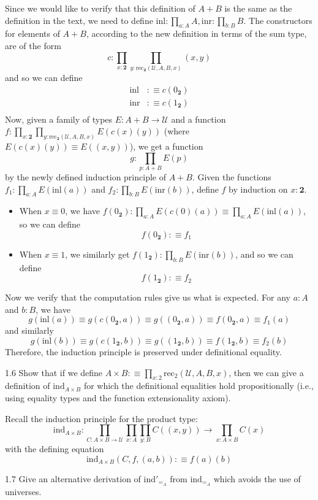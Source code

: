\documentclass[14pt]{extarticle}
\newcommand{\0}{{\mathbf 0}}
\newcommand{\1}{{\mathbf 1}}
\newcommand{\2}{{\mathbf 2}}
\newcommand{\UU}{{\mathcal U}}
\newcommand{\rec}{\mathrm{rec}}
\newcommand{\ind}{\mathrm{ind}}
\newcommand{\inl}{\mathrm{inl}}
\newcommand{\inr}{\mathrm{inr}}
\begin{document}
Since we would like to verify that this definition of $A+B$ is the same as the definition in the text, we need to define $\inl : \prod_{a:A} A, \inr : \prod_{b:B} B$. The constructors for elements of $A+B$, according to the new definition in terms of the sum type, are of the form \[c : \prod_{x : \2}\prod_{y : \rec_\2(\UU,A,B,x)}(x,y)\] and so we can define
\begin{align*}
\inl &:\equiv c(0_\2) \\
\inr &:\equiv c(1_\2) \\
\end{align*}
Now, given a family of types $E : A+B \to \UU$ and a function $f : \prod_{x:\2}\prod_{y:\rec_\2(\UU,A,B,x)}E(c(x)(y))$ (where $E(c(x)(y)) \equiv E((x,y))$), we get a function \[g : \prod_{p : A+B}E(p)\] by the newly defined induction principle of $A+B$. Given the functions $f_1 : \prod_{a:A}E(\inl(a))$ and $f_2 : \prod_{b:B}E(\inr(b))$, define $f$ by induction on $x:\2$.
\begin{itemize}
\item When $x \equiv 0$, we have $f(0_\2) : \prod_{a:A}E(c(0)(a)) \equiv \prod_{a:A}E(\inl(a))$, so we can define
\[f(0_\2) :\equiv f_1  \]
\item When $x \equiv 1$, we similarly get $f(1_\2) : \prod_{b:B}E(\inr(b))$, and so we can define
\[f(1_\2) :\equiv f_2\]
\end{itemize}
Now we verify that the computation rules give us what is expected. For any $a:A$ and $b:B$, we have
\[g(\inl(a)) \equiv g(c(0_\2,a)) \equiv g((0_\2,a)) \equiv f(0_\2,a) \equiv f_1(a)\] and similarly
\[g(\inl(b)) \equiv g(c(1_\2,b)) \equiv g((1_\2,b)) \equiv f(1_\2,b) \equiv f_2(b)\]
Therefore, the induction principle is preserved under definitional equality.

\begin{prob}{1.6}{}
Show that if we define $A \times B :\equiv \prod_{x:2}\rec_2(\UU,A,B,x)$, then we can give a definition of $\ind_{A\times B}$ for which the definitional equalities hold propositionally (i.e., using equality types and the function extensionality axiom).
\end{prob}
Recall the induction principle for the product type:
\[\ind_{A \times B} :\prod_{C : A \times B \to \UU} \prod_{x : A}\prod_{y : B}C((x,y)) \to \prod_{x : A \times B}C(x)\] with the defining equation 
\[\ind_{A \times B}(C,f,(a,b)) :\equiv f(a)(b)\]

\begin{prob}{1.7}{}
Give an alternative derivation of $\ind'_{=_A}$ from $\ind_{=_A}$ which avoids the use of universes.
\end{prob}
\end{document}
